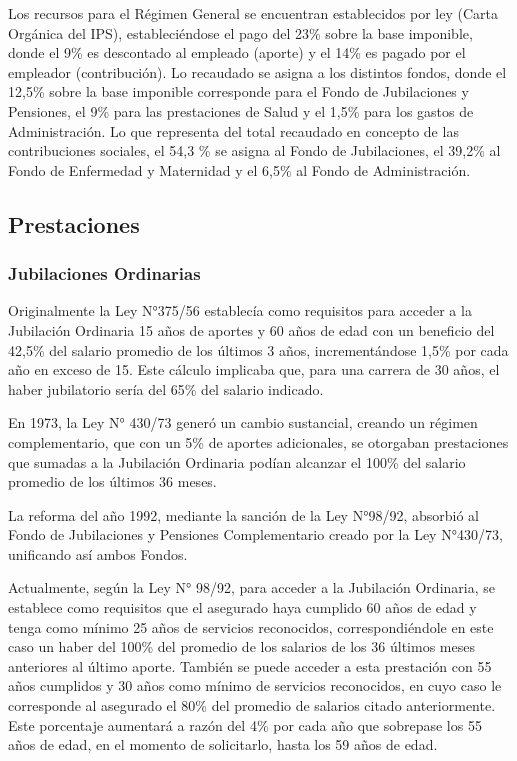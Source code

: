 Los recursos para el Régimen General se encuentran establecidos por ley (Carta Orgánica del IPS), estableciéndose el pago del 23\% sobre la base imponible, donde el 9\% es descontado al empleado (aporte) y el 14\% es pagado por el empleador (contribución).  Lo recaudado se asigna a los distintos fondos, donde el 12,5\% sobre la base imponible corresponde para el Fondo de Jubilaciones y Pensiones, el 9\% para las prestaciones de Salud y el 1,5\% para los gastos de Administración. Lo que representa del total recaudado en concepto de las contribuciones sociales, el 54,3 \% se asigna al Fondo de Jubilaciones, el 39,2\% al Fondo de Enfermedad y Maternidad y el 6,5\% al Fondo de Administración.

\subsection{Prestaciones}

\subsubsection{Jubilaciones Ordinarias}

Originalmente la Ley N°375/56 establecía como requisitos para acceder a la Jubilación Ordinaria 15 años de aportes y 60 años de edad con un beneficio del 42,5\% del salario promedio de los últimos 3 años, incrementándose 1,5\% por cada año en exceso de 15.  Este cálculo implicaba que, para una carrera de 30 años, el haber jubilatorio sería del 65\% del salario indicado.  

En 1973, la Ley N° 430/73 generó un cambio sustancial, creando un régimen complementario, que con un 5\% de aportes adicionales, se otorgaban prestaciones que sumadas a la Jubilación Ordinaria podían alcanzar el 100\% del salario promedio de los últimos 36 meses. 

La reforma del año 1992, mediante la sanción de la Ley N°98/92, absorbió al Fondo de Jubilaciones y Pensiones Complementario creado por la Ley N°430/73, unificando así ambos Fondos.

Actualmente, según la Ley N° 98/92, para acceder a la Jubilación Ordinaria, se establece como requisitos que el asegurado haya cumplido 60 años de edad y tenga como mínimo 25 años de servicios reconocidos, correspondiéndole en este caso un haber del 100\% del promedio de los salarios de los 36 últimos meses anteriores al último aporte.  También se puede acceder a esta prestación con 55 años cumplidos y 30 años como mínimo de servicios reconocidos, en cuyo caso le corresponde al asegurado el 80\% del promedio de salarios citado anteriormente. Este porcentaje aumentará a razón del 4\% por cada año que sobrepase los 55 años de edad, en el momento de solicitarlo, hasta los 59 años de edad. 

